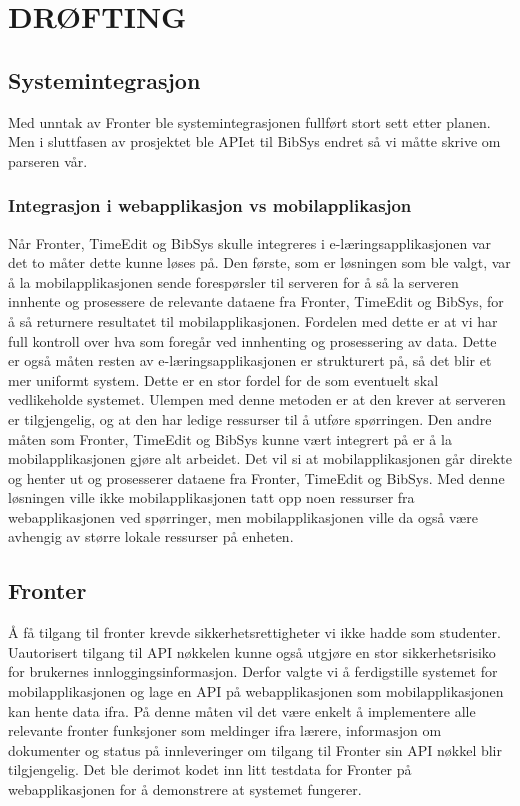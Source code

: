\documentclass[../main.tex]{subfiles}
\begin{document}
\chapter{DR{\O}FTING}

\section{Systemintegrasjon}
Med unntak av Fronter ble systemintegrasjonen fullført stort sett etter planen. Men i sluttfasen av prosjektet ble APIet til BibSys endret så vi måtte skrive om parseren vår.

\subsection{Integrasjon i webapplikasjon vs mobilapplikasjon}
Når Fronter, TimeEdit og BibSys skulle integreres i e-læringsapplikasjonen var det to måter dette kunne løses på. Den første, som er løsningen som ble valgt, var å la mobilapplikasjonen sende forespørsler til serveren for å så la serveren innhente og prosessere de relevante dataene fra Fronter, TimeEdit og BibSys, for å så returnere resultatet til mobilapplikasjonen. Fordelen med dette er at vi har full kontroll over hva som foregår ved innhenting og prosessering av data. Dette er også måten resten av e-læringsapplikasjonen er strukturert på, så det blir et mer uniformt system. Dette er en stor fordel for de som eventuelt skal vedlikeholde systemet. Ulempen med denne metoden er at den krever at serveren er tilgjengelig, og at den har ledige ressurser til å utføre spørringen.\newline
Den andre måten som Fronter, TimeEdit og BibSys kunne vært integrert på er å la mobilapplikasjonen gjøre alt arbeidet. Det vil si at mobilapplikasjonen går direkte og henter ut og prosesserer dataene fra Fronter, TimeEdit og BibSys. Med denne løsningen ville ikke mobilapplikasjonen tatt opp noen ressurser fra webapplikasjonen ved spørringer, men mobilapplikasjonen ville da også være avhengig av større lokale ressurser på enheten.

\section{Fronter}

Å få tilgang til fronter krevde sikkerhetsrettigheter vi ikke hadde som studenter. Uautorisert tilgang til API nøkkelen kunne også utgjøre en stor sikkerhetsrisiko for brukernes innloggingsinformasjon. Derfor valgte vi å ferdigstille systemet for mobilapplikasjonen og lage en API på webapplikasjonen som mobilapplikasjonen kan hente data ifra. På denne måten vil det være enkelt å implementere alle relevante fronter funksjoner som meldinger ifra lærere, informasjon om dokumenter og status på innleveringer om tilgang til Fronter sin API nøkkel blir tilgjengelig. Det ble derimot kodet inn litt testdata for Fronter på webapplikasjonen for å demonstrere at systemet fungerer.
\end{document}
